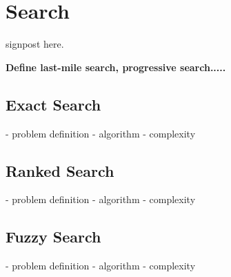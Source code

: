 \section{Search}
\label{section:search}

signpost here. 

\textbf{Define last-mile search, progressive search.....}

\subsection{Exact Search}
- problem definition
- algorithm
- complexity

\subsection{Ranked Search}
- problem definition
- algorithm
- complexity

\subsection{Fuzzy Search}
- problem definition
- algorithm
- complexity



